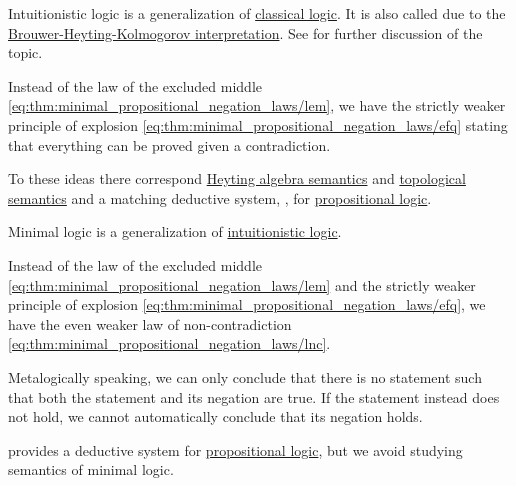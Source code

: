 \begin{definition}\label{def:intuitionistic_logic}
  Intuitionistic logic is a generalization of \hyperref[def:classical_logic]{classical logic}. It is also called  due to the \hyperref[def:brouwer_heyting_kolmogorov_interpretation]{Brouwer-Heyting-Kolmogorov interpretation}. See  for further discussion of the topic.

  Instead of the law of the excluded middle \eqref{eq:thm:minimal_propositional_negation_laws/lem}, we have the strictly weaker principle of explosion \eqref{eq:thm:minimal_propositional_negation_laws/efq} stating that everything can be proved given a contradiction.

  To these ideas there correspond \hyperref[def:propositional_heyting_algebra_semantics]{Heyting algebra semantics} and \hyperref[def:propositional_topological_semantics]{topological semantics} and a matching deductive system, , for \hyperref[subsec:propositional_logic]{propositional logic}.
\end{definition}

\begin{definition}\label{def:minimal_logic}
  Minimal logic is a generalization of \hyperref[def:intuitionistic_logic]{intuitionistic logic}.

  Instead of the law of the excluded middle \eqref{eq:thm:minimal_propositional_negation_laws/lem} and the strictly weaker principle of explosion \eqref{eq:thm:minimal_propositional_negation_laws/efq}, we have the even weaker law of non-contradiction \eqref{eq:thm:minimal_propositional_negation_laws/lnc}.

  Metalogically speaking, we can only conclude that there is no statement such that both the statement and its negation are true. If the statement instead does not hold, we cannot automatically conclude that its negation holds.

   provides a deductive system for \hyperref[subsec:propositional_logic]{propositional logic}, but we avoid studying semantics of minimal logic.
\end{definition}

